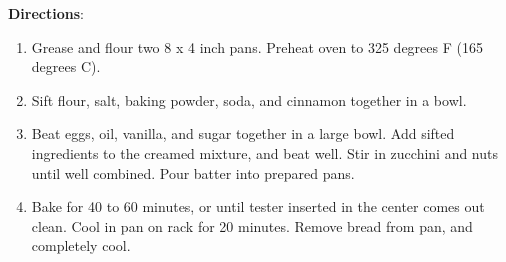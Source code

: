 \documentclass[11pt, twoside, openany]{book}
\begin{document}
\begin{minipage}[t]{\linewidth}
\textbf{Directions}:
\vspace{-3mm}\begin{enumerate}\setlength\itemsep{-1mm}
\item Grease and flour two 8 x 4 inch pans. Preheat oven to 325 degrees F (165 degrees C).
\item Sift flour, salt, baking powder, soda, and cinnamon together in a bowl.
\item Beat eggs, oil, vanilla, and sugar together in a large bowl. Add sifted ingredients to the creamed mixture, and beat well. Stir in zucchini and nuts until well combined. Pour batter into prepared pans.
\item Bake for 40 to 60 minutes, or until tester inserted in the center comes out clean. Cool in pan on rack for 20 minutes. Remove bread from pan, and completely cool.
\end{enumerate}
\end{minipage}\vspace{8mm}
\end{document}
